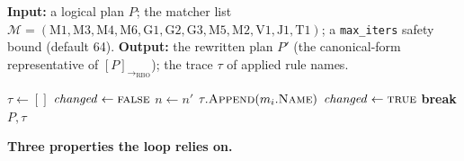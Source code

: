 \documentclass[sigconf]{acmart}
\theoremstyle{plain}
\theoremstyle{definition}
\theoremstyle{remark}
\begin{document}
\begin{algorithm}[t]
\caption{RBO fixed-point loop with priority-ordered matchers.}\label{alg:rbo}
\textbf{Input:} a logical plan $P$; the matcher list
$\mathcal{M} = (\mathrm{M1}, \mathrm{M3}, \mathrm{M4}, \mathrm{M6},
\mathrm{G1}, \mathrm{G2}, \mathrm{G3}, \mathrm{M5}, \mathrm{M2},
\mathrm{V1}, \mathrm{J1}, \mathrm{T1})$; a
\texttt{max\_iters} safety bound (default 64).
\textbf{Output:} the rewritten plan $P'$ (the
canonical-form representative of $[P]_{\to_{\mathrm{RBO}}}$);
the trace $\tau$ of applied rule names.
\begin{algorithmic}[1]
  \State $\tau \gets []$
  \Repeat
    \State $\mathit{changed} \gets \textsc{false}$
          \State $n \gets n'$
          \State $\tau.\Call{Append}{m_i.\textsc{Name}}$
          \State $\mathit{changed} \gets \textsc{true}$
          \State \textbf{break} 
        \EndIf
      \EndFor
    \EndFor
  \State \Return $P, \tau$
\end{algorithmic}
\end{algorithm}

\noindent\textbf{Three properties the loop relies on.}
\end{document}
